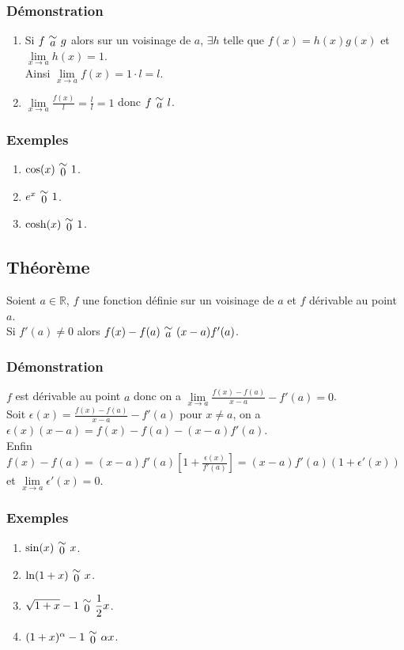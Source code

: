 \documentclass[a4paper,10pt]{book} %
\newcommand{\R}{\mathbb{R}}
\newcommand{\equi}[1]{\renewcommand{\arraystretch}{0.3}~\begin{matrix}\sim\\#1\end{matrix}~\renewcommand{\arraystretch}{1}}
\begin{document}
\subsubsection{Démonstration}
\begin{enumerate}
\item Si $f \equi{a} g$ alors sur un voisinage de $a$, $\exists h$ telle que $f(x)=h(x)g(x)$ et $\lim\limits_{ x\rightarrow a}h(x)=1$.\\
Ainsi $\lim\limits_{x\rightarrow a}f(x)=1\cdot l=l$.
\item $\displaystyle\lim\limits_{x\rightarrow a}\frac{f(x)}{l}=\frac{l}{l}=1$ donc $f\equi{a}l$.
\end{enumerate}

\subsubsection{Exemples}
\begin{enumerate}
\item $\cos(x) \equi{0} 1$.
\item $e^x \equi{0} 1$.
\item $\cosh(x) \equi{0} 1$.
\end{enumerate}

\subsection{Théorème}
Soient $a \in \R$, $f$ une fonction définie sur un voisinage de $a$ et $f$ dérivable au point $a$.\\
Si $f'(a)\neq 0$ alors $f(x)-f(a) \equi{a} (x-a)f'(a)$.

\subsubsection{Démonstration}
$f$ est dérivable au point $a$ donc on a $\displaystyle\lim\limits_{x\rightarrow a} \frac{f(x)-f(a)}{x-a}-f'(a)=0$.\\
Soit $\displaystyle\epsilon(x)=\frac{f(x)-f(a)}{x-a}-f'(a)$ pour $x\neq a$, on a $\epsilon(x)(x-a)=f(x)-f(a)-(x-a)f'(a)$.\\

Enfin $\displaystyle f(x)-f(a)=(x-a)f'(a)\left[1+\frac{\epsilon(x)}{f'(a)}\right]=(x-a)f'(a)(1+\epsilon'(x))$ et $\lim\limits_{x\rightarrow a}\epsilon'(x)=0$.

\subsubsection{Exemples}
\begin{enumerate}
\item $\sin(x) \equi{0} x$.
\item $\ln(1+x) \equi{0} x$.
\item $\displaystyle\sqrt{1+x}-1 \equi{0} \frac{1}{2}x$.
\item $(1+x)^\alpha-1 \equi{0}\alpha x$.
\end{enumerate}\bigskip
\end{document}
